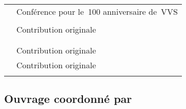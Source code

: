 \begin{table}[!htbp]
\begin{tabular}{ll}
  \citet{Zolotov08} & Conférence pour le~100\ieme{} anniversaire de~VVS \\
  \citet{Konchalovsky08} & \citet{Konchalovsky02} \\
  \citet{Yurenev08} & Contribution originale \\
  \citet{Borisov08} & \citet{Borisov00} \\
  \citet{Nikonovich08b} & \citet{Nikonovich79} \\
  \citet{Lobanov08b} & Contribution originale \\
  \citet{Badeyan08} & Contribution originale \\
  \citet{Prokofiev08} & \citet{Prokofiev02} \\
  \bottomrule
 \end{tabular}
\end{table}

\subsection{Ouvrage coordonné par \citeauthor{Scriabine}}

